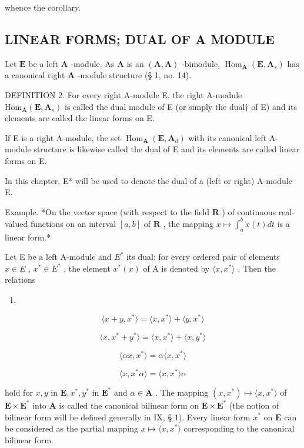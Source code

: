 whence the corollary.

\subsection{LINEAR FORMS; DUAL OF A MODULE}

Let \(\mathbf{E}\) be a left \(\mathbf{A}\) -module. As \(\mathbf{A}\) is an \((\mathbf{A}, \mathbf{A})\) -bimodule, \(\operatorname{Hom}_{\mathbf{A}}(\mathbf{E}, \mathbf{A}_s)\) has a canonical right \(\mathbf{A}\) -module structure (§ 1, no. 14).

DEFINITION 2. For every right A-module E, the right A-module \(\mathrm{Hom}_{\mathbf{A}}(\mathbf{E},\mathbf{A}_{s})\) is called the dual module of E (or simply the dual† of E) and its elements are called the linear forms on E.

If E is a right A-module, the set \(\operatorname{Hom}_{\mathbf{A}}(\mathbf{E}, \mathbf{A}_{d})\) with its canonical left A-module structure is likewise called the dual of E and its elements are called linear forms on E.

In this chapter, E* will be used to denote the dual of a (left or right) A-module E.

Example. *On the vector space (with respect to the field \(\mathbf{R}\) ) of continuous real-valued functions on an interval \([a, b]\) of \(\mathbf{R}\) , the mapping \(x \mapsto \int_{a}^{b} x(t) dt\) is a linear form.*

Let E be a left A-module and \(E^{*}\) its dual; for every ordered pair of elements \(x \in E\) , \(x^{*} \in E^{*}\) , the element \(x^{*}(x)\) of A is denoted by \(\langle x, x^{*} \rangle\) . Then the relations

\begin{enumerate}
\def\labelenumi{(\arabic{enumi})}
\setcounter{enumi}{8}
\tightlist
\item
\end{enumerate}

\[
\langle x + y, x ^ {*} \rangle = \langle x, x ^ {*} \rangle + \langle y, x ^ {*} \rangle\tag{10}
\]

\[
\langle x, x ^ {*} + y ^ {*} \rangle = \langle x, x ^ {*} \rangle + \langle x, y ^ {*} \rangle\tag{11}
\]

\[
\langle \alpha x, x ^ {*} \rangle = \alpha \langle x, x ^ {*} \rangle\tag{12}
\]

\[
\langle x, x ^ {*} \alpha \rangle = \langle x, x ^ {*} \rangle \alpha
\]

hold for \(x, y\) in \(\mathbf{E}, x^*, y^*\) in \(\mathbf{E}^*\) and \(\alpha \in \mathbf{A}\) . The mapping \((x, x^*) \mapsto \langle x, x^* \rangle\) of \(\mathbf{E} \times \mathbf{E}^*\) into \(\mathbf{A}\) is called the canonical bilinear form on \(\mathbf{E} \times \mathbf{E}^*\) (the notion of bilinear form will be defined generally in IX, § 1). Every linear form \(x^*\) on \(\mathbf{E}\) can be considered as the partial mapping \(x \mapsto \langle x, x^* \rangle\) corresponding to the canonical bilinear form.

